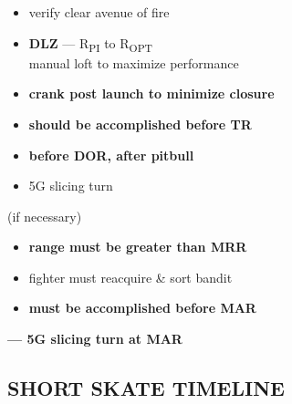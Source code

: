 \begin{checklistenumerate}[start=0]
    \blueitem[Employment]
    \label{subsec:ttpaa:timeline:skate:shoot}
    \begin{itemize} 
        \item verify clear avenue of fire
        \item \textbf{DLZ} --- R\textsubscript{PI} to R\textsubscript{OPT}\\
        manual loft to maximize performance
        \item \textbf{crank post launch to minimize closure}
        \item \textbf{should be accomplished before TR}
    \end{itemize}
    

    \blueitem[Out]
    \label{subsec:ttpaa:timeline:skate:out}
    \begin{itemize}
        \item \textbf{before DOR, after pitbull}
        \item 5G slicing turn
    \end{itemize}
    \blueitem[Recommit] (if necessary)
    \label{subsec:ttpaa:timeline:skate:recommit}
    \begin{itemize}
        \item \textbf{range must be greater than MRR}
        \item fighter must reacquire \& sort bandit
    \end{itemize}
    \blueitem[Employment]
    \label{subsec:ttpaa:timeline:skate:shoot2}
    \begin{itemize}
        \item \textbf{must be accomplished before MAR}
    \end{itemize}
    \blueitem[Out]%
    \label{subsec:ttpaa:timeline:skate:out2}
    \textbf{--- 5G slicing turn at MAR}
\end{checklistenumerate}

\clearpage

\subsection{SHORT SKATE TIMELINE}
\label{subsec:ttpaa:timeline:shortskate}

